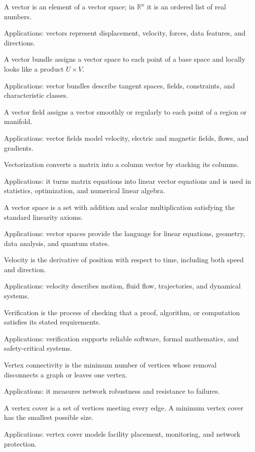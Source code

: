 A vector is an element of a vector space; in $\mathbb R^n$ it is an ordered list of real numbers. \par\noindent Applications: vectors represent displacement, velocity, forces, data features, and directions.

A vector bundle assigns a vector space to each point of a base space and locally looks like a product $U\times V$. \par\noindent Applications: vector bundles describe tangent spaces, fields, constraints, and characteristic classes.

A vector field assigns a vector smoothly or regularly to each point of a region or manifold. \par\noindent Applications: vector fields model velocity, electric and magnetic fields, flows, and gradients.

Vectorization converts a matrix into a column vector by stacking its columns. \par\noindent Applications: it turns matrix equations into linear vector equations and is used in statistics, optimization, and numerical linear algebra.

A vector space is a set with addition and scalar multiplication satisfying the standard linearity axioms. \par\noindent Applications: vector spaces provide the language for linear equations, geometry, data analysis, and quantum states.

Velocity is the derivative of position with respect to time, including both speed and direction. \par\noindent Applications: velocity describes motion, fluid flow, trajectories, and dynamical systems.

Verification is the process of checking that a proof, algorithm, or computation satisfies its stated requirements. \par\noindent Applications: verification supports reliable software, formal mathematics, and safety-critical systems.

Vertex connectivity is the minimum number of vertices whose removal disconnects a graph or leaves one vertex. \par\noindent Applications: it measures network robustness and resistance to failures.

A vertex cover is a set of vertices meeting every edge. A minimum vertex cover has the smallest possible size. \par\noindent Applications: vertex cover models facility placement, monitoring, and network protection.

